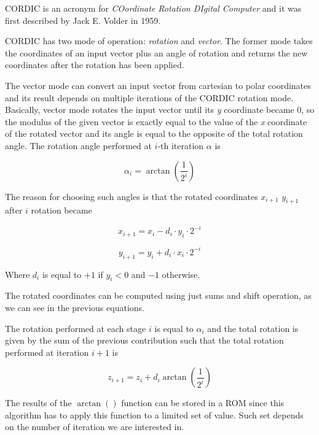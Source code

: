 \documentclass[12pt,a4paper]{report}
\begin{document}
CORDIC is an acronym for \emph{COordinate Rotation DIgital Computer} and it was first described by Jack E. Volder in 1959.

CORDIC has two mode of operation: \emph{rotation} and \emph{vector}. The former mode takes the coordinates of an input vector plus an angle of rotation and returns the new coordinates after the rotation has been applied.

The vector mode can convert an input vector from cartesian to polar coordinates and its result depends on multiple iterations of the CORDIC rotation mode. Basically, vector mode rotates the input vector until its \emph{y} coordinate became 0, so the modulus of the given vector is exactly equal to the value of the \emph{x} coordinate of the rotated vector and its angle is equal to the opposite of the total rotation angle.\newline
The rotation angle performed at $i$-th iteration $\alpha$ is

\begin{equation}
\alpha_{i} = \arctan \left(\dfrac{1}{2^i}\right)
\end{equation}

The reason for choosing such angles is that the rotated coordinates $x_{i+1}$ $y_{i+1}$  after $i$ rotation became

\begin{equation}
x_{i+1} = x_{i} - d_{i} \cdot y_{i} \cdot 2^{-i}
\end{equation}

\begin{equation}
y_{i+1} = y_{i} + d_{i} \cdot x_{i} \cdot 2^{-i}
\end{equation}

Where $d_{i}$ is equal to $+1$ if $y_{i} < 0$ and $-1$ otherwise.

The rotated coordinates can be computed using just sums and shift operation, as we can see in the previous equations.

The rotation performed at each stage $i$ is equal to $\alpha_{i}$ and the total rotation is given by the sum of the previous contribution such that the total rotation performed at iteration $i+1$ is

\begin{equation}
z_{i+1} = z_{i} + d_{i} \arctan \left(\dfrac{1}{2^i}\right)
\end{equation}


The results of the $\arctan()$ function can be stored in a ROM since this algorithm has to apply this function to a limited set of value. Such set depends on the number of iteration we are interested in.
\end{document}
